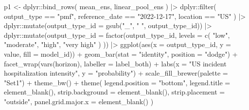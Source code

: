 \documentclass[
]{article}
\newenvironment{Shaded}{\begin{snugshade}}{\end{snugshade}}
\newcommand{\AttributeTok}[1]{\textcolor[rgb]{0.40,0.45,0.13}{#1}}
\newcommand{\FunctionTok}[1]{\textcolor[rgb]{0.28,0.35,0.67}{#1}}
\newcommand{\NormalTok}[1]{\textcolor[rgb]{0.00,0.23,0.31}{#1}}
\newcommand{\OtherTok}[1]{\textcolor[rgb]{0.00,0.23,0.31}{#1}}
\newcommand{\SpecialCharTok}[1]{\textcolor[rgb]{0.37,0.37,0.37}{#1}}
\newcommand{\StringTok}[1]{\textcolor[rgb]{0.13,0.47,0.30}{#1}}
\begin{document}
\begin{Shaded}
\begin{Highlighting}[]
\NormalTok{p1 }\OtherTok{\textless{}{-}}\NormalTok{ dplyr}\SpecialCharTok{::}\FunctionTok{bind\_rows}\NormalTok{(}
\NormalTok{  mean\_ens,}
\NormalTok{  linear\_pool\_ens}
\NormalTok{) }\SpecialCharTok{|\textgreater{}}
\NormalTok{  dplyr}\SpecialCharTok{::}\FunctionTok{filter}\NormalTok{(}
\NormalTok{    output\_type }\SpecialCharTok{==} \StringTok{"pmf"}\NormalTok{, reference\_date }\SpecialCharTok{==} \StringTok{"2022{-}12{-}17"}\NormalTok{,}
\NormalTok{    location }\SpecialCharTok{==} \StringTok{"US"}
\NormalTok{  ) }\SpecialCharTok{|\textgreater{}}
\NormalTok{  dplyr}\SpecialCharTok{::}\FunctionTok{mutate}\NormalTok{(}\AttributeTok{output\_type\_id =} \FunctionTok{gsub}\NormalTok{(}\StringTok{"\_"}\NormalTok{, }\StringTok{" "}\NormalTok{, output\_type\_id)) }\SpecialCharTok{|\textgreater{}}
\NormalTok{  dplyr}\SpecialCharTok{::}\FunctionTok{mutate}\NormalTok{(}\AttributeTok{output\_type\_id =} \FunctionTok{factor}\NormalTok{(output\_type\_id,}
    \AttributeTok{levels =} \FunctionTok{c}\NormalTok{(}
      \StringTok{"low"}\NormalTok{, }\StringTok{"moderate"}\NormalTok{, }\StringTok{"high"}\NormalTok{,}
      \StringTok{"very high"}
\NormalTok{    )}
\NormalTok{  )) }\SpecialCharTok{|\textgreater{}}
  \FunctionTok{ggplot}\NormalTok{(}\FunctionTok{aes}\NormalTok{(}\AttributeTok{x =}\NormalTok{ output\_type\_id, }\AttributeTok{y =}\NormalTok{ value, }\AttributeTok{fill =}\NormalTok{ model\_id)) }\SpecialCharTok{+}
  \FunctionTok{geom\_bar}\NormalTok{(}\AttributeTok{stat =} \StringTok{"identity"}\NormalTok{, }\AttributeTok{position =} \StringTok{"dodge"}\NormalTok{) }\SpecialCharTok{+}
  \FunctionTok{facet\_wrap}\NormalTok{(}\FunctionTok{vars}\NormalTok{(horizon), }\AttributeTok{labeller =}\NormalTok{ label\_both) }\SpecialCharTok{+}
  \FunctionTok{labs}\NormalTok{(}\AttributeTok{x =} \StringTok{"US incident hospitalization intensity"}\NormalTok{, }\AttributeTok{y =} \StringTok{"probability"}\NormalTok{) }\SpecialCharTok{+}
  \FunctionTok{scale\_fill\_brewer}\NormalTok{(}\AttributeTok{palette =} \StringTok{"Set1"}\NormalTok{) }\SpecialCharTok{+}
  \FunctionTok{theme\_bw}\NormalTok{() }\SpecialCharTok{+}
  \FunctionTok{theme}\NormalTok{(}
    \AttributeTok{legend.position =} \StringTok{"bottom"}\NormalTok{, }\AttributeTok{legend.title =} \FunctionTok{element\_blank}\NormalTok{(),}
    \AttributeTok{strip.background =} \FunctionTok{element\_blank}\NormalTok{(), }\AttributeTok{strip.placement =} \StringTok{"outside"}\NormalTok{,}
    \AttributeTok{panel.grid.major.x =} \FunctionTok{element\_blank}\NormalTok{()}
\NormalTok{  )}


\end{Highlighting}
\end{Shaded}
\end{document}
